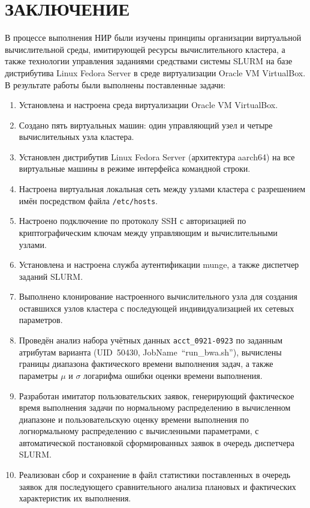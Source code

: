 \newpage
\section*{ЗАКЛЮЧЕНИЕ}

В процессе выполнения НИР были изучены принципы организации
виртуальной вычислительной среды, имитирующей ресурсы вычислительного
кластера, а также технологии управления заданиями средствами системы
SLURM на базе дистрибутива Linux Fedora Server в среде виртуализации
Oracle VM VirtualBox. В результате работы были выполнены поставленные
задачи:

\begin{enumerate}
\item Установлена и настроена среда виртуализации Oracle VM VirtualBox.

\item Создано пять виртуальных машин: один управляющий узел и четыре
вычислительных узла кластера.

\item Установлен дистрибутив Linux Fedora Server (архитектура aarch64)
на все виртуальные машины в режиме интерфейса командной строки.

\item Настроена виртуальная локальная сеть между узлами кластера с
разрешением имён посредством файла \texttt{/etc/hosts}.

\item Настроено подключение по протоколу SSH с авторизацией по
криптографическим ключам между управляющим и вычислительными узлами.

\item Установлена и настроена служба аутентификации munge, а также
диспетчер заданий SLURM.

\item Выполнено клонирование настроенного вычислительного узла для
создания оставшихся узлов кластера с последующей индивидуализацией их
сетевых параметров.

\item Проведён анализ набора учётных данных \texttt{acct\_0921-0923}
по заданным атрибутам варианта (UID~50430, JobName~``run\_bwa.sh''),
вычислены границы диапазона фактического времени выполнения задач, а
также параметры $\mu$ и $\sigma$ логарифма ошибки оценки времени
выполнения.

\item Разработан имитатор пользовательских заявок, генерирующий
фактическое время выполнения задачи по нормальному распределению в
вычисленном диапазоне и пользовательскую оценку времени выполнения по
логнормальному распределению с вычисленными параметрами, с
автоматической постановкой сформированных заявок в очередь диспетчера
SLURM.

\item Реализован сбор и сохранение в файл статистики поставленных в
очередь заявок для последующего сравнительного анализа плановых и
фактических характеристик их выполнения.
\end{enumerate}

